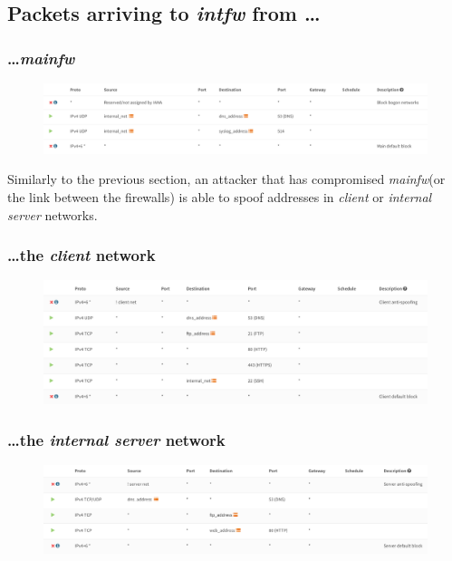 \documentclass{homework}
\newcommand{\client}{\textit{client}\xspace}
\newcommand{\ser}{\textit{internal server}\xspace}
\newcommand{\intfw}{\textit{intfw}\xspace}
\newcommand{\mainfw}{\textit{mainfw}\xspace}
\begin{document}
    \subsection{Packets arriving to \intfw from \dots}
    \subsubsection{\dots \mainfw}
    \begin{figure}[H]
        \centering
        \includegraphics[width=\linewidth]{images/intfw-main}
        \label{fig:intfw-main}
    \end{figure}
    Similarly to the previous section, an attacker that has compromised \mainfw (or the link between the firewalls) is able to spoof addresses in \client or \ser networks.
    
    \subsubsection{\dots the \client network}
    \begin{figure}[H]
        \centering
        \includegraphics[width=\linewidth]{images/intfw-client}
        \label{fig:intfw-client}
    \end{figure}
    
    \subsubsection{\dots the \ser network}
    \begin{figure}[H]
        \centering
        \includegraphics[width=\linewidth]{images/intfw-server}
        \label{fig:intfw-server}
    \end{figure}
    
\end{document}
